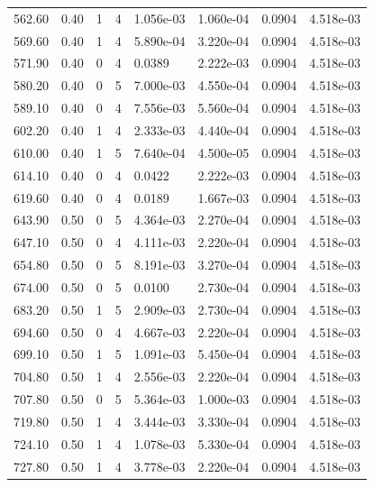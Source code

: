 \documentclass[preview]{standalone}
\begin{document}
{{{{\begin{tabular}{L{1.2cm}C{1.2cm} C{0.3cm}C{0.5cm} C{1.4cm}C{1.4cm} C{1.4cm}C{1.4cm}}
  562.60  &  0.40  & 1     &  4 &  1.056e-03  & 1.060e-04  & 0.0904 &  4.518e-03   \\ 
  569.60  &  0.40  & 1     &  4 &  5.890e-04  & 3.220e-04  & 0.0904 &  4.518e-03   \\ 
  571.90  &  0.40  & 0     &  4 &  0.0389  & 2.222e-03  & 0.0904 &  4.518e-03   \\ 
  580.20  &  0.40  & 0     &  5 &  7.000e-03  & 4.550e-04  & 0.0904 &  4.518e-03   \\ 
  589.10  &  0.40  & 0     &  4 &  7.556e-03  & 5.560e-04  & 0.0904 &  4.518e-03   \\ 
  602.20  &  0.40  & 1     &  4 &  2.333e-03  & 4.440e-04  & 0.0904 &  4.518e-03   \\ 
  610.00  &  0.40  & 1     &  5 &  7.640e-04  & 4.500e-05  & 0.0904 &  4.518e-03   \\ 
  614.10  &  0.40  & 0     &  4 &  0.0422  & 2.222e-03  & 0.0904 &  4.518e-03   \\ 
  619.60  &  0.40  & 0     &  4 &  0.0189  & 1.667e-03  & 0.0904 &  4.518e-03   \\ 
  643.90  &  0.50  & 0     &  5 &  4.364e-03  & 2.270e-04  & 0.0904 &  4.518e-03   \\ 
  647.10  &  0.50  & 0     &  4 &  4.111e-03  & 2.220e-04  & 0.0904 &  4.518e-03   \\ 
  654.80  &  0.50  & 0     &  5 &  8.191e-03  & 3.270e-04  & 0.0904 &  4.518e-03   \\ 
  674.00  &  0.50  & 0     &  5 &  0.0100  & 2.730e-04  & 0.0904 &  4.518e-03   \\ 
  683.20  &  0.50  & 1     &  5 &  2.909e-03  & 2.730e-04  & 0.0904 &  4.518e-03   \\ 
  694.60  &  0.50  & 0     &  4 &  4.667e-03  & 2.220e-04  & 0.0904 &  4.518e-03   \\ 
  699.10  &  0.50  & 1     &  5 &  1.091e-03  & 5.450e-04  & 0.0904 &  4.518e-03   \\ 
  704.80  &  0.50  & 1     &  4 &  2.556e-03  & 2.220e-04  & 0.0904 &  4.518e-03   \\ 
  707.80  &  0.50  & 0     &  5 &  5.364e-03  & 1.000e-03  & 0.0904 &  4.518e-03   \\ 
  719.80  &  0.50  & 1     &  4 &  3.444e-03  & 3.330e-04  & 0.0904 &  4.518e-03   \\ 
  724.10  &  0.50  & 1     &  4 &  1.078e-03  & 5.330e-04  & 0.0904 &  4.518e-03   \\ 
  727.80  &  0.50  & 1     &  4 &  3.778e-03  & 2.220e-04  & 0.0904 &  4.518e-03   \\ 

\end{tabular}}}}}
\end{document}
